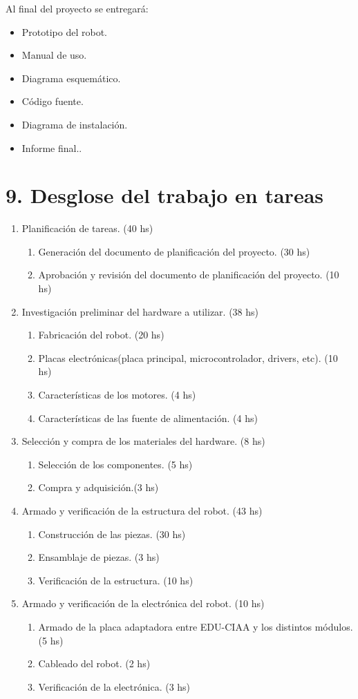 \documentclass[
11pt, %
codirector, %
]{charter}
\begin{document}
Al final del proyecto se entregará: 
\begin{itemize}
\item Prototipo del robot.
\item Manual de uso.
\item Diagrama esquemático.
\item Código fuente.
\item Diagrama de instalación.
\item Informe final..
\end{itemize}


\section{9. Desglose del trabajo en tareas}
\label{sec:wbs}

\begin{enumerate}
\item Planificación de tareas. (40 hs)
	\begin{enumerate}
	\item Generación del documento de planificación del proyecto. (30 hs)
	\item Aprobación y revisión del documento de planificación del proyecto. (10 hs)
	\end{enumerate}
\item Investigación preliminar del hardware a utilizar. (38 hs)
	\begin{enumerate}
	\item Fabricación del robot. (20 hs)
	\item Placas electrónicas(placa principal, microcontrolador, drivers, etc). (10 hs)
	\item Características de los motores.  (4 hs)
	\item Características de las fuente de alimentación. (4 hs)
	\end{enumerate}
\item Selección y compra de los materiales del hardware. (8 hs)
	\begin{enumerate}
	\item Selección de los componentes. (5 hs)
	\item Compra y adquisición.(3 hs)
	\end{enumerate}
\item Armado y verificación de la estructura del robot. (43 hs)
	\begin{enumerate}
	\item Construcción de las piezas. (30 hs)
	\item Ensamblaje de piezas. (3 hs)
	\item Verificación de la estructura. (10 hs)
	\end{enumerate}
\item Armado y verificación de la electrónica del robot. (10 hs)
	\begin{enumerate}
	\item Armado de la placa adaptadora entre EDU-CIAA y los distintos módulos. (5 hs)
	\item Cableado del robot. (2 hs)
	\item Verificación de la electrónica. (3 hs)
	\end{enumerate}	


\end{enumerate}
\end{document}
